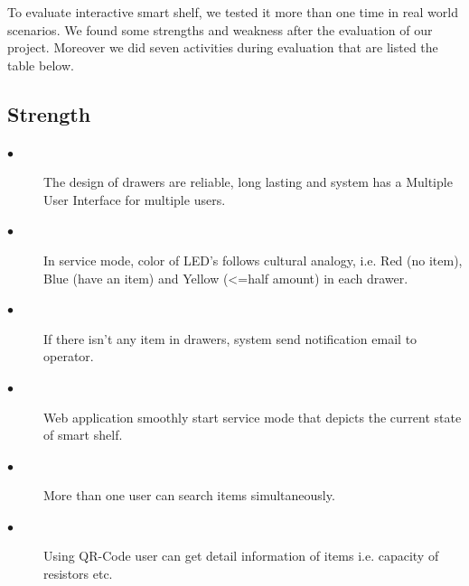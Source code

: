  
To evaluate interactive smart shelf, we tested it more than one time in real world scenarios. We found some strengths and weakness after the evaluation of our project. Moreover we did seven activities during evaluation that are listed the table below.

\subsection{Strength} 
\begin{description}
  \item[$\bullet$] The design of drawers are reliable, long lasting and system has a Multiple User Interface for multiple users.
   \item[$\bullet$] In service mode, color of LED's follows cultural analogy, i.e. Red (no item), Blue (have an item) and Yellow (<=half amount) in each drawer.
   \item[$\bullet$] If there isn't any item in drawers, system send notification email to operator.
   \item[$\bullet$] Web application smoothly start service mode that depicts the current state of smart shelf.
   \item[$\bullet$] More than one user can search items simultaneously.
   \item[$\bullet$] Using QR-Code user can get detail information of items i.e. capacity of resistors etc.
   \end{description}
